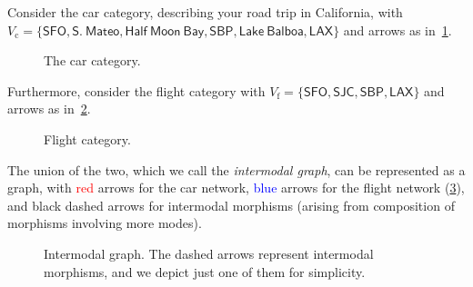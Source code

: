 \begin{example}
Consider the car category, describing your road trip in California, with $V_\mathrm{c}=\{\mathsf{SFO},\mathsf{S.}\ \mathsf{Mateo},\mathsf{Half} \ \mathsf{Moon}\ \mathsf{Bay},\mathsf{SBP},\mathsf{Lake}\ \mathsf{Balboa},\mathsf{LAX}\}$ and arrows as in~\cref{fig:carcat}.

\begin{figure}[h!]
\begin{center}
\end{center}
\caption{The car category. \label{fig:carcat}}
\end{figure}

Furthermore, consider the flight category with $V_\mathrm{f}=\{\mathsf{SFO},\mathsf{SJC},\mathsf{SBP},\mathsf{LAX}\}$ and arrows as in~\cref{fig:subcat}.


\begin{figure}[h!]
\begin{center}
\end{center}
\caption{Flight category. \label{fig:subcat}}
\end{figure}
The union of the two, which we call the \emph{intermodal graph}, can be represented as a graph, with \textcolor{red}{red} arrows for the car network, \textcolor{blue}{blue} arrows for the flight network (\cref{fig:intermodal}), and black dashed arrows for intermodal morphisms (arising from composition of morphisms involving more modes).

\begin{figure}[h!]
\begin{center}
\end{center}
\caption{Intermodal graph. The dashed arrows represent intermodal morphisms, and we depict just one of them for simplicity. \label{fig:intermodal}}
\end{figure}
\end{example}


